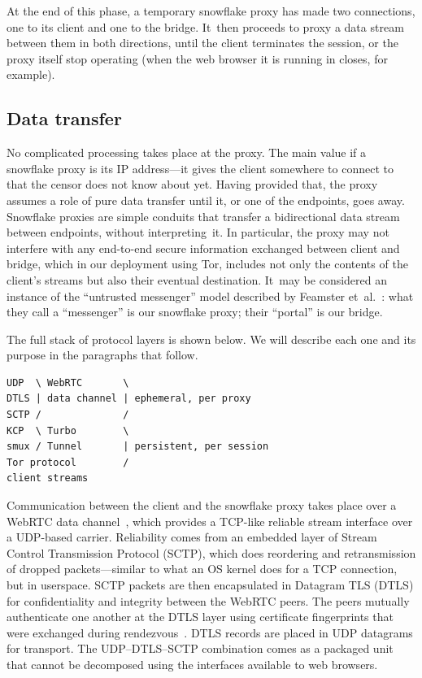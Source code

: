 \documentclass[letterpaper,twocolumn]{article}
\begin{document}
At the end of this phase,
a temporary snowflake proxy has made two connections,
one to its client and one to the bridge.
It~then proceeds to proxy a data stream between them
in both directions,
until the client terminates the session,
or the proxy itself stop operating
(when the web browser it is running in closes, for example).

\subsection{Data transfer}
\label{sec:data-transfer}

No complicated processing takes place at the proxy.
The main value if a snowflake proxy is its IP address---it
gives the client somewhere to connect to that the censor does not know about yet.
Having provided that, the proxy assumes a role
of pure data transfer until it, or one of the endpoints, goes away.
Snowflake proxies are simple conduits that transfer
a bidirectional data stream between endpoints,
without interpreting~it.
In particular, the proxy may not interfere with any
end-to-end secure information exchanged between client and bridge,
which in our deployment using Tor,
includes not only the contents of the client's streams
but also their eventual destination.
It~may be considered an instance of the
``untrusted messenger'' model described by
Feamster et~al.~\cite[\S 3]{Feamster2003a}:
what they call a ``messenger'' is our snowflake proxy;
their ``portal'' is our bridge.

The full stack of protocol layers is shown below.
We will describe each one and its purpose
in the paragraphs that follow.

\begin{verbatim}
UDP  \ WebRTC       \
DTLS | data channel | ephemeral, per proxy
SCTP /              /
KCP  \ Turbo        \
smux / Tunnel       | persistent, per session
Tor protocol        /
client streams
\end{verbatim}

Communication between the client and the snowflake proxy
takes place over
a WebRTC data channel~\cite{rfc8831}, which
provides a TCP-like
reliable stream interface over a UDP-based carrier.
Reliability comes from an embedded layer of
Stream Control Transmission Protocol (SCTP), which
does reordering and retransmission of dropped packets---similar
to what an OS kernel does for a TCP connection,
but in userspace.
SCTP packets are then encapsulated in Datagram TLS (DTLS)
for confidentiality and integrity between the WebRTC peers.
The peers mutually authenticate one another
at the DTLS layer using certificate fingerprints
that were exchanged during rendezvous~\cite[\S 5.1]{rfc8842}.
DTLS records are placed in UDP datagrams for transport.
The UDP--DTLS--SCTP combination comes as a packaged unit
that cannot be decomposed using the interfaces available to web browsers.
\end{document}
